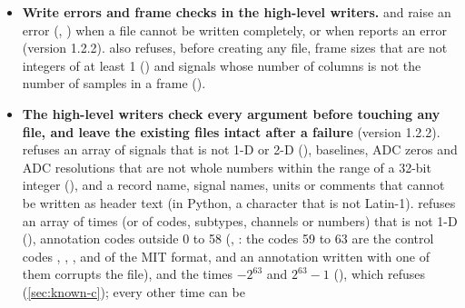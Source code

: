 \begin{itemize}
  returns the header of a record without opening its signal files: the
  sampling and counter frequencies, the base counter value, the number of
  samples, the signal specifications, the info strings, the metadata, and the
  start time and date.  and  give the
  start time as text (), in milliseconds after midnight
  (, which keeps the milliseconds of a start time such
  as ), and the start date as year, month and day
  ().
\item \textbf{Write errors and frame checks in the high-level writers.}
   and  raise an error
  (, ) when a file cannot be written completely, or when
   reports an error (version 1.2.2). 
  also refuses, before creating any file, frame sizes that are not integers
  of at least 1 () and
  signals whose number of columns is not the number of samples in a frame
  ().
\item \textbf{The high-level writers check every argument before touching
  any file, and leave the existing files intact after a failure} (version
  1.2.2).  refuses an array of signals that is not 1-D or
  2-D (), baselines, ADC zeros and
  ADC resolutions that are not whole numbers within the range of a 32-bit
  integer (), and a record name, signal names, units or
  comments that cannot be written as header text (in Python, a character
  that is not Latin-1).  refuses an array of times
  (or of codes, subtypes, channels or numbers) that is not 1-D
  (), annotation codes outside 0 to 58
  (, : the codes 59 to 63 are the control codes , ,
  ,  and  of the MIT format, and an annotation
  written with one of them corrupts the file), and the times $-2^{63}$ and
  $2^{63}-1$ (),
  which  refuses (\cref{sec:known-c}); every other time can be

\end{itemize}
